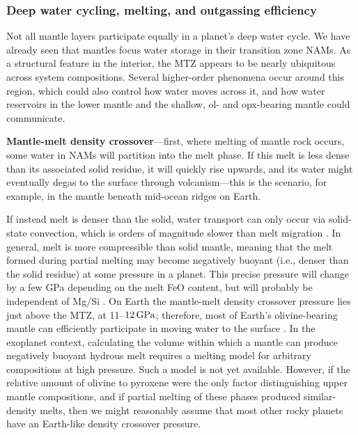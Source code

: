 \documentclass[fleqn,usenatbib]{mnras}
\newcommand{\todo}[1]{\textit{\textcolor{violet}{{#1}}}}
\begin{document}
\subsubsection{Deep water cycling, melting, and outgassing efficiency}\label{sec:discussion-dynamics}


Not all mantle layers participate equally in a planet's deep water cycle. We have already seen that mantles focus water storage in their transition zone NAMs. As a structural feature in the interior, the MTZ appears to be nearly ubiquitous across system compositions. Several higher-order phenomena occur around this region, which could also control how water moves across it, and how water reservoirs in the lower mantle and the shallow, ol- and opx-bearing mantle could communicate.

\medskip

\textbf{Mantle-melt density crossover}---first, where melting of mantle rock occurs, some water in NAMs will partition into the melt phase. If this melt is less dense than its associated solid residue, it will quickly rise upwards, and its water might eventually degas to the surface through volcanism---this is the scenario, for example, in the mantle beneath mid-ocean ridges on Earth. 

If instead melt is denser than the solid, water transport can only occur via solid-state convection, which is orders of magnitude slower \citep[not more than metres per year;][]{ricard_702_2015} than melt migration \citep[$\sim$30$\,{\rm m}\,{\rm yr}^{-1}$;][]{katz_physics_2022}. In general, melt is more compressible than solid mantle, meaning that the melt formed during partial melting may become negatively buoyant (i.e., denser than the solid residue) at some pressure in a planet. This precise pressure will change by a few GPa depending on the melt FeO content, but will probably be independent of Mg/Si \citep{ohtani_melting_1995, agee_compressibility_2008}. On Earth the mantle-melt density crossover pressure lies just above the MTZ, at 11--$12\,{\rm GPa}$; therefore, most of Earth's olivine-bearing mantle can efficiently participate in moving water to the surface \citep{andrault_mantle_2022}. In the exoplanet context, calculating the volume within which a mantle can produce negatively buoyant hydrous melt requires a melting model for arbitrary compositions at high pressure. Such a model is not yet available. However, if the relative amount of olivine to pyroxene were the only factor distinguishing upper mantle compositions, and if partial melting of these phases produced similar-density melts, then we might reasonably assume that most other rocky planets have an Earth-like density crossover pressure.
\end{document}
